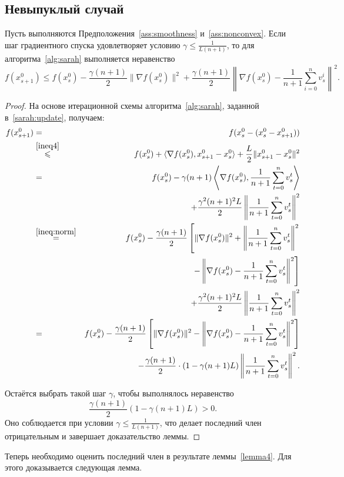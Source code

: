 \subsection{Невыпуклый случай}
\begin{lemma}\label{lemma4}
Пусть выполняются Предположения~\ref{ass:smoothness} и~\ref{ass:nonconvex}. Если шаг градиентного спуска удовлетворяет условию $\gamma \leqslant \frac{1}{L(n+1)}$, то для алгоритма~\ref{alg:sarah} выполняется неравенство
\begin{equation*}
    f(x_{s+1}^0) \leqslant f(x_s^0) - \frac{\gamma(n+1)}{2}\|\nabla f(x_s^0)\|^2 + \frac{\gamma(n+1)}{2}\left\|\nabla f(x_s^0) - \frac{1}{n+1}\sum\limits_{i=0}^n v_s^i\right\|^2.
\end{equation*}
\begin{proof}
На основе итерационной схемы алгоритма~\ref{alg:sarah}, заданной в~\eqref{sarah:update}, получаем:
\begin{eqnarray*}
    f(x_{s+1}^0) &=& f(x_s^0 - (x_s^0 - x_{s+1}^0)) \\
    &\overset{\eqref{ineq4}}{\leqslant}& f(x_s^0) + \langle \nabla f(x_s^0), x_{s+1}^0 - x_s^0\rangle + \frac{L}{2}\|x_{s+1}^0 - x_s^0\|^2 \\
    &=& f(x_s^0) - \gamma(n+1)\left\langle \nabla f(x_s^0), \frac{1}{n+1}\sum\limits_{t=0}^n v_s^t\right\rangle \\
    &&\quad + \frac{\gamma^2(n+1)^2L}{2}\left\|\frac{1}{n+1}\sum\limits_{t=0}^n v_s^t\right\|^2 \\
    &\overset{\eqref{ineq:norm}}{=}& f(x_s^0) - \frac{\gamma(n+1)}{2}\left[\|\nabla f(x_s^0)\|^2 + \left\|\frac{1}{n+1}\sum\limits_{t=0}^n v_s^t\right\|^2 \right.\\
    &&\quad \left. - \left\|\nabla f(x_s^0) - \frac{1}{n+1}\sum\limits_{t=0}^n v_s^t\right\|^2 \right] \\
    &&\quad + \frac{\gamma^2(n+1)^2L}{2}\left\|\frac{1}{n+1}\sum\limits_{t=0}^n v_s^t\right\|^2 \\
    &=& f(x_s^0) - \frac{\gamma(n+1)}{2}\left[\|\nabla f(x_s^0)\|^2 - \left\|\nabla f(x_s^0) - \frac{1}{n+1}\sum\limits_{t=0}^n v_s^t\right\|^2 \right] \\
    &&\quad - \frac{\gamma(n+1)}{2} \cdot \left(1 - \gamma(n+1)L\right)\left\|\frac{1}{n+1}\sum\limits_{t=0}^n v_s^t\right\|^2.
\end{eqnarray*}

Остаётся выбрать такой шаг \(\gamma\), чтобы выполнялось неравенство \[\frac{\gamma(n+1)}{2}\left(1 - \gamma(n+1)L\right) > 0.\] Оно соблюдается при условии \(\gamma \leqslant \frac{1}{L(n+1)}\), что делает последний член отрицательным и завершает доказательство леммы.
\end{proof}
\end{lemma}
Теперь необходимо оценить последний член в результате леммы~\ref{lemma4}. Для этого доказывается следующая лемма.

